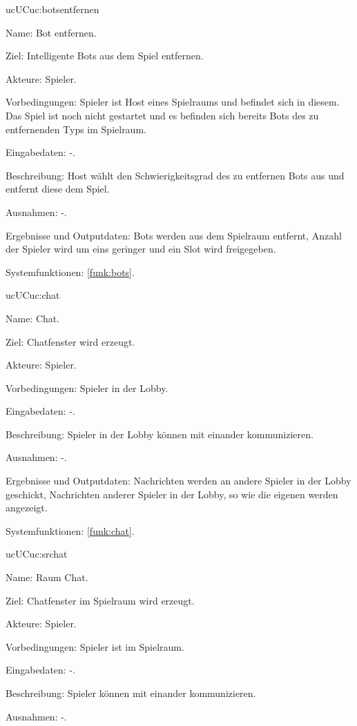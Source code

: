 \begin{description}[leftmargin=5em, style=sameline]
	\begin{lhp}{uc}{UC}{uc:botsentfernen}
		\item [Name:] Bot entfernen.
		\item [Ziel:] Intelligente Bots aus dem Spiel entfernen.
		\item [Akteure:] Spieler. 
		\item [Vorbedingungen:]  Spieler ist Host eines Spielraums und befindet sich in diesem. Das Spiel ist noch nicht gestartet und es befinden sich  bereits Bots des zu entfernenden Typs im Spielraum.
		\item [Eingabedaten:] -. %
		\item [Beschreibung:] Host wählt den Schwierigkeitsgrad des zu entfernen Bots aus und entfernt diese dem Spiel.
		\item [Ausnahmen:] -.
		\item [Ergebnisse und Outputdaten:] Bots werden aus dem Spielraum entfernt, Anzahl der Spieler wird um eins geringer und ein Slot wird freigegeben.
		\item [Systemfunktionen:] \ref{funk:bots}. %
	\end{lhp}
	
	\begin{lhp}{uc}{UC}{uc:chat} %
		\item [Name:] Chat.
		\item [Ziel:] Chatfenster wird erzeugt.
		\item [Akteure:] Spieler.
		\item [Vorbedingungen:] Spieler in der Lobby.
		\item [Eingabedaten:] -. %
		\item [Beschreibung:] Spieler in der Lobby können mit einander kommunizieren.
		\item [Ausnahmen:] -.
		\item [Ergebnisse und Outputdaten:] Nachrichten werden an andere Spieler in der Lobby geschickt, Nachrichten anderer Spieler in der Lobby, so wie die eigenen werden angezeigt.	
		\item [Systemfunktionen:] \ref{funk:chat}. %
	\end{lhp}
	
		\begin{lhp}{uc}{UC}{uc:srchat} %
		\item [Name:] Raum Chat.
		\item [Ziel:] Chatfenster im Spielraum wird erzeugt.
		\item [Akteure:] Spieler.
		\item [Vorbedingungen:] Spieler ist im Spielraum.
		\item [Eingabedaten:] -. %
		\item [Beschreibung:] Spieler können mit einander kommunizieren.
		\item [Ausnahmen:] -.
			

\end{lhp}
\end{description}
